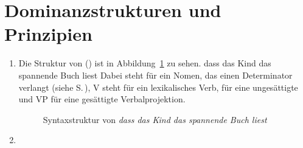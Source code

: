 \section{Dominanzstrukturen und Prinzipien}

\begin{enumerate}
\item 

Die Struktur von () ist in Abbildung~\ref{fig-dass-der-mann} zu sehen. 
\ea
dass das Kind das spannende Buch liest
\z
Dabei steht \nbar für
ein Nomen, das einen Determinator verlangt (siehe S.\,\pageref{ex-abkuerzung-nbar}), V steht für ein lexikalisches
Verb, \vbar für eine ungesättigte und VP für eine gesättigte Verbalprojektion.
\begin{figure}
\caption{\label{fig-dass-der-mann}Syntaxstruktur von \emph{dass das Kind das spannende Buch liest}}
\end{figure}
\item 
\largerpage[2]
\eanoraggedright
{}
\end{enumerate}
